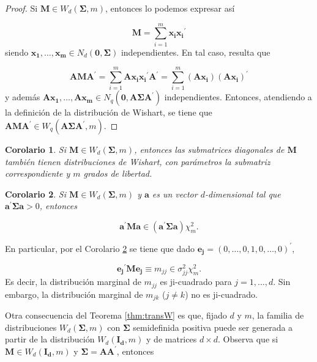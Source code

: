 \documentclass[
  a4paper,
  oneside]{scrbook}
\newtheorem{corollary}{Corolario}[chapter]
\theoremstyle{definition}
\theoremstyle{definition}
\theoremstyle{definition}
\theoremstyle{definition}
\theoremstyle{remark}
\begin{document}
\begin{proof}
Si \(\bm{M}\in W_d(\bm\Sigma,m)\), entonces lo podemos expresar así

\[\bm{M}=\sum_{i=1}^m\bm{x_i}\bm{x_i}^{\prime}\] siendo \(\bm{x_1},\ldots,\bm{x_m}\in N_d(\bm{0},\bm\Sigma)\) independientes. En tal caso, resulta que

\[\bm{A}\bm{M}\bm{A}^{\prime}=\sum_{i=1}^m \bm{A}\bm{x_i} \bm{x_i}^{\prime}\bm{A}^{\prime}
=\sum_{i=1}^m \left(\bm{A}\bm{x_i}\right) \left(\bm{A}\bm{x_i}\right)^{\prime}\]
y además \(\bm{A}\bm{x_1},\ldots,\bm{A}\bm{x_m}\in N_q(\bm{0},\bm{A}\bm\Sigma \bm{A}^{\prime})\)
independientes. Entonces, atendiendo a la definición de la distribución
de Wishart, se tiene que
\(\bm{A}\bm{M}\bm{A}^{\prime}\in W_q\left(\bm{A}\bm\Sigma \bm{A}^{\prime},m\right)\).
\end{proof}

\begin{corollary}
\protect\hypertarget{cor:unnamed-chunk-99}{}\label{cor:unnamed-chunk-99}Si \(\bm{M}\in W_d(\bm\Sigma,m)\), entonces las submatrices diagonales de
\(\bm{M}\) también tienen distribuciones de Wishart, con parámetros la
submatriz correspondiente y \(m\) grados de libertad.
\end{corollary}

\begin{corollary}
\protect\hypertarget{cor:colW}{}\label{cor:colW}Si \(\bm{M}\in W_d(\bm\Sigma,m)\) y
\(\bm{a}\) es un vector \(d\)-dimensional tal que
\(\bm{a}^\prime{}\bm\Sigma \bm{a}>0\), entonces

\[\bm{a}^\prime{}\bm{M}\bm{a}\in \left(\bm{a}^\prime{}\bm\Sigma \bm{a}\right)\chi_m^2.\]
\end{corollary}

En particular, por el Corolario \ref{cor:colW} se tiene que dado
\(\bm{e_j}=(0,\ldots,0,1,0,\ldots,0)^\prime{}\),

\[\bm{e_j}^\prime{}\bm{M}\bm{e_j}\equiv m_{jj}\in \sigma_{jj}^2\chi_m^2.\]
Es decir, la distribución marginal de \(m_{jj}\) es ji-cuadrado para
\(j=1,\ldots,d\). Sin embargo, la distribución marginal de \(m_{jk}\)
(\(j\neq k\)) no es ji-cuadrado.

Otra consecuencia del Teorema \ref{thm:transW} es que, fijado \(d\) y \(m\), la familia de
distribuciones \(W_d(\bm\Sigma,m)\) con \(\bm\Sigma\) semidefinida positiva
puede ser generada a partir de la distribución \(W_d(\bm{I_d},m)\) y de
matrices \(d\times d\). Observa que si \(\bm{M}\in W_d(\bm{I_d},m)\) y
\(\bm\Sigma=\bm{A}\bm{A}^\prime{}\), entonces
\end{document}
